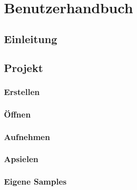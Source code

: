 \section{Benutzerhandbuch}
\subsection{Einleitung}
\subsection{Projekt}
\subsubsection{Erstellen}
\subsubsection{Öffnen}
\subsubsection{Aufnehmen}
\subsubsection{Apsielen}
\subsubsection{Eigene Samples}
